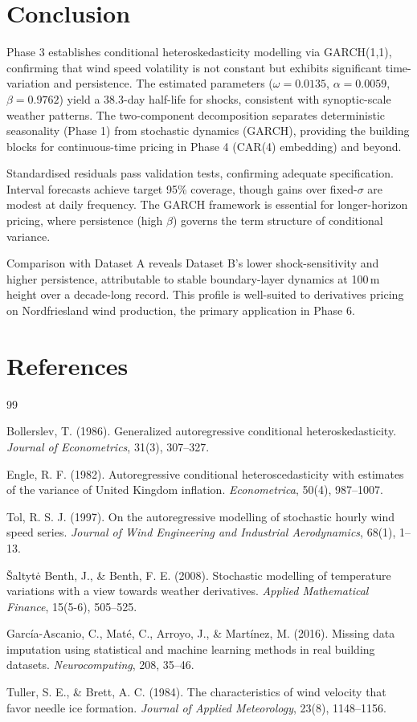 \documentclass[11pt, a4paper, twoside]{article}
\begin{document}
\section{Conclusion}

Phase 3 establishes conditional heteroskedasticity modelling via GARCH(1,1), confirming that wind speed volatility is not constant but exhibits significant time-variation and persistence. The estimated parameters ($\omega = 0.0135$, $\alpha = 0.0059$, $\beta = 0.9762$) yield a 38.3-day half-life for shocks, consistent with synoptic-scale weather patterns. The two-component decomposition separates deterministic seasonality (Phase 1) from stochastic dynamics (GARCH), providing the building blocks for continuous-time pricing in Phase 4 (CAR(4) embedding) and beyond.

Standardised residuals pass validation tests, confirming adequate specification. Interval forecasts achieve target 95\% coverage, though gains over fixed-$\sigma$ are modest at daily frequency. The GARCH framework is essential for longer-horizon pricing, where persistence (high $\beta$) governs the term structure of conditional variance.

Comparison with Dataset A reveals Dataset B's lower shock-sensitivity and higher persistence, attributable to stable boundary-layer dynamics at 100\,m height over a decade-long record. This profile is well-suited to derivatives pricing on Nordfriesland wind production, the primary application in Phase 6.

\section*{References}

\begin{thebibliography}{99}

Bollerslev, T. (1986). Generalized autoregressive conditional heteroskedasticity. \textit{Journal of Econometrics}, 31(3), 307--327.

Engle, R. F. (1982). Autoregressive conditional heteroscedasticity with estimates of the variance of United Kingdom inflation. \textit{Econometrica}, 50(4), 987--1007.

Tol, R. S. J. (1997). On the autoregressive modelling of stochastic hourly wind speed series. \textit{Journal of Wind Engineering and Industrial Aerodynamics}, 68(1), 1--13.

Šaltytė Benth, J., \& Benth, F. E. (2008). Stochastic modelling of temperature variations with a view towards weather derivatives. \textit{Applied Mathematical Finance}, 15(5-6), 505--525.

García-Ascanio, C., Maté, C., Arroyo, J., \& Martínez, M. (2016). Missing data imputation using statistical and machine learning methods in real building datasets. \textit{Neurocomputing}, 208, 35--46.

Tuller, S. E., \& Brett, A. C. (1984). The characteristics of wind velocity that favor needle ice formation. \textit{Journal of Applied Meteorology}, 23(8), 1148--1156.

\end{thebibliography}
\end{document}
